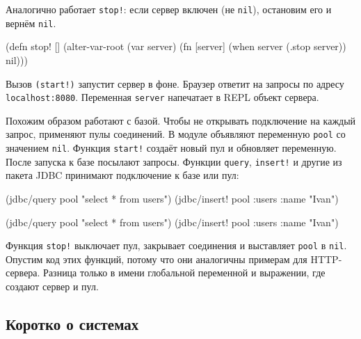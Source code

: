 \fi

\noindent
Аналогично работает \verb|stop!|: если сервер включен (не \verb|nil|),
остановим его и вернём \verb|nil|.

\begin{english}
  \begin{clojure}
(defn stop! []
  (alter-var-root
   (var server)
   (fn [server]
     (when server
       (.stop server))
     nil)))
  \end{clojure}
\end{english}

\mnoindent
Вызов \verb|(start!)| запустит сервер в фоне. Браузер ответит на запросы по
адресу \texttt{localhost\-:8080}. Переменная \verb|server| напечатает в REPL
объект сервера.


Похожим образом работают с базой. Чтобы не открывать подключение на каждый
запрос, применяют пулы соединений. В модуле объявляют переменную \verb|pool|
со значением \verb|nil|. Функция \verb|start!| создаёт новый пул и обновляет
переменную. После запуска к базе посылают запросы. Функции \verb|query|,
\verb|insert!| и другие из пакета JDBC принимают подключение к базе или пул:

\ifx\DEVICETYPE\MOBILE

\begin{english}
  \begin{clojure}
(jdbc/query pool "select * from users")
(jdbc/insert! pool
  :users {:name "Ivan"})
  \end{clojure}
\end{english}

\else

\begin{english}
  \begin{clojure}
(jdbc/query pool "select * from users")
(jdbc/insert! pool :users {:name "Ivan"})
  \end{clojure}
\end{english}

\fi

Функция \verb|stop!| выключает пул, закрывает соединения и выставляет
\verb|pool| в \verb|nil|. Опустим код этих функций, потому что они
аналогичны примерам для HTTP-сервера. Разница только в имени глобальной
переменной и выражении, где создают сервер и пул.

\subsection{Коротко о системах}

